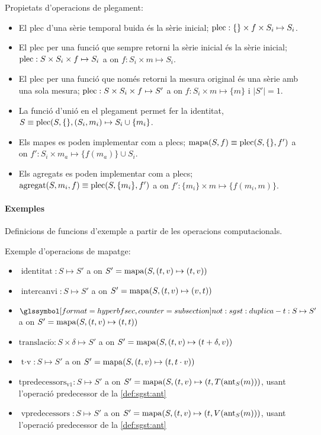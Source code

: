 Propietats d'operacions de plegament:
\begin{itemize}
\item El plec d'una sèrie temporal buida és la sèrie inicial; $\operatorname*{plec}:
  \{\} \times f \times S_i \mapsto S_i$.

\item El plec per una funció que sempre retorni la sèrie inicial és la
  sèrie inicial; $\operatorname*{plec}: S \times S_i \times f \mapsto S_i$ a on
  $f: S_i \times m \mapsto S_i$.

\item El plec per una funció que només retorni la mesura original és
  una sèrie amb una sola mesura; $\operatorname*{plec}: S \times S_i \times f \mapsto
  S'$ a on $f:S_i\times m \mapsto \{m\}$ i $|S'|=1$.


\item La funció d'unió en el plegament permet fer la identitat, $S
  \equiv \operatorname*{plec}(S,\{\},(S_i,m_i) \mapsto S_i \cup \{m_i\}$.


\item Els mapes es poden implementar com a plecs; $\operatorname*{mapa}(S,f) \equiv
  \operatorname*{plec}(S,\{\},f')$ a on $f': S_i \times m_a \mapsto \{f(m_a)\}
  \cup S_i$. 

\item Els agregats es poden implementar com a plecs; $\operatorname*{agregat}(S,m_i,f)
  \equiv \operatorname*{plec}(S,\{m_i\},f')$ a on $f': \{m_i\} \times m \mapsto
  \{f(m_i,m)\}$.



\end{itemize}


\paragraph{Exemples} Definicions de funcions d'exemple a partir de les
operacions computacionals.

Exemple d'operacions de mapatge:
\begin{itemize}
\item $\operatorname{identitat}: S \mapsto S'$ a on $S'=
  \operatorname*{mapa}(S,(t,v)\mapsto(t,v))$
\item $\operatorname{intercanvi}: S \mapsto S'$ a on $S'=
  \operatorname*{mapa}(S,(t,v)\mapsto(v,t))$
\item $\glssymbolsec{not:sgst:duplica-t}: S \mapsto S'$ a on $S'=
  \operatorname*{mapa}(S,(t,v)\mapsto(t,t))$
\item $\operatorname{translaci\acute{o}}: S \times \delta \mapsto S'$ a on $S'=
  \operatorname*{mapa}(S,(t,v)\mapsto(t+\delta,v))$
\item $\operatorname{t\cdot v}: S \mapsto S'$ a on $S'=
  \operatorname*{mapa}(S,(t,v)\mapsto(t,t\cdot v))$
\item $\operatorname{tpredecessors_{v1}}: S \mapsto S'$ a on $S'= \operatorname*{mapa}(S,(t,v)
  \mapsto (t,T(\operatorname*{ant}_S(m)))$, usant l'operació predecessor de la
  \autoref{def:sgst:ant}
\item $\operatorname{vpredecessors}: S \mapsto S'$ a on $S'= \operatorname*{mapa}(S,(t,v)
  \mapsto (t,V(\operatorname*{ant}_S(m)))$, usant l'operació predecessor de la
  \autoref{def:sgst:ant}
\end{itemize}

